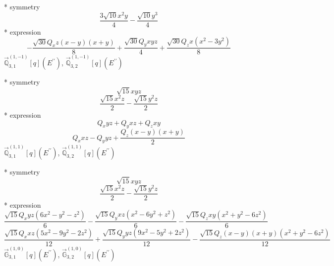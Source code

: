 \documentclass[fleqn,8pt]{jsarticle}
\begin{document}
\noindent\quad ** symmetry
\begin{dmath*}
\frac{3 \sqrt{10} x^{2} y}{4} - \frac{\sqrt{10} y^{3}}{4}
\end{dmath*}
\noindent\quad ** expression
\begin{dmath*}
- \frac{\sqrt{30} Q_{x} z \left(x - y\right) \left(x + y\right)}{8} + \frac{\sqrt{30} Q_{y} x y z}{4} + \frac{\sqrt{30} Q_{z} x \left(x^{2} - 3 y^{2}\right)}{8}
\end{dmath*}
\noindent\quad $\vec{\mathbb{Q}}_{3,1}^{(1,-1)}[q](E^{\prime\prime})$, $\vec{\mathbb{Q}}_{3,2}^{(1,-1)}[q](E^{\prime\prime})$

\noindent\quad ** symmetry
\begin{dmath*}
\sqrt{15} x y z
\end{dmath*}
\begin{dmath*}
\frac{\sqrt{15} x^{2} z}{2} - \frac{\sqrt{15} y^{2} z}{2}
\end{dmath*}
\noindent\quad ** expression
\begin{dmath*}
Q_{x} y z + Q_{y} x z + Q_{z} x y
\end{dmath*}
\begin{dmath*}
Q_{x} x z - Q_{y} y z + \frac{Q_{z} \left(x - y\right) \left(x + y\right)}{2}
\end{dmath*}
\noindent\quad $\vec{\mathbb{Q}}_{3,1}^{(1,1)}[q](E^{\prime\prime})$, $\vec{\mathbb{Q}}_{3,2}^{(1,1)}[q](E^{\prime\prime})$

\noindent\quad ** symmetry
\begin{dmath*}
\sqrt{15} x y z
\end{dmath*}
\begin{dmath*}
\frac{\sqrt{15} x^{2} z}{2} - \frac{\sqrt{15} y^{2} z}{2}
\end{dmath*}
\noindent\quad ** expression
\begin{dmath*}
\frac{\sqrt{15} Q_{x} y z \left(6 x^{2} - y^{2} - z^{2}\right)}{6} - \frac{\sqrt{15} Q_{y} x z \left(x^{2} - 6 y^{2} + z^{2}\right)}{6} - \frac{\sqrt{15} Q_{z} x y \left(x^{2} + y^{2} - 6 z^{2}\right)}{6}
\end{dmath*}
\begin{dmath*}
\frac{\sqrt{15} Q_{x} x z \left(5 x^{2} - 9 y^{2} - 2 z^{2}\right)}{12} + \frac{\sqrt{15} Q_{y} y z \left(9 x^{2} - 5 y^{2} + 2 z^{2}\right)}{12} - \frac{\sqrt{15} Q_{z} \left(x - y\right) \left(x + y\right) \left(x^{2} + y^{2} - 6 z^{2}\right)}{12}
\end{dmath*}
\noindent\quad $\vec{\mathbb{G}}_{3,1}^{(1,0)}[q](E^{\prime\prime})$, $\vec{\mathbb{G}}_{3,2}^{(1,0)}[q](E^{\prime\prime})$
\end{document}
